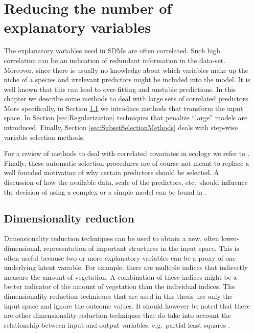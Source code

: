 \chapter{Reducing the number of explanatory variables}
\label{ch:ReducingTheNumberOfExplanatoryVariables}
The explanatory variables used in SDMs are often correlated. Such high correlation can be an indication of redundant information in the data-set. Moreover, since there is usually no knowledge about which variables make up the niche of a species and irrelevant predictors might be included into the model. It is well known that this can lead to over-fitting and unstable predictions. In this chapter we describe some methods to deal with large sets of correlated predictors. More specifically, in Section \ref{sec:DimensionalityReduction} we introduce methods that transform the input space. In Section \ref{sec:Regularization} techniques that penalize ``large'' models are introduced. Finally, Section \ref{sec:SubsetSelectionMethods} deals with step-wise variable selection methods.


For a review of methods to deal with correlated covariates in ecology we refer to \cite{dormann_collinearity:_2013}. Finally, these automatic selection procedures are of course not meant to replace a well founded motivation of why certain predictors should be selected. A discussion of how the available data, scale of the predictors, etc.\ should influence the decision of using a complex or a simple model can be found in \cite{merow_what_2014}.

\section{Dimensionality reduction}
\label{sec:DimensionalityReduction}
Dimensionality reduction techniques can be used to obtain a new, often lower-dimensional, representation of important structures in the input space. This is often useful because two or more explanatory variables can be a proxy of one underlying latent variable. For example, there are multiple indices that indirectly measure the amount of vegetation. A combination of these indices might be a better indicator of the amount of vegetation than the individual indices. The dimensionality reduction techniques that are used in this thesis use only the input space and ignore the outcome values. It should however be noted that there are other dimensionality reduction techniques that do take into account the relationship between input and output variables, e.g.\ partial least squares \parencite[see e.g.][]{marx_iteratively_1996}.

